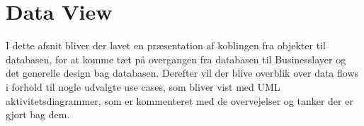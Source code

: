 \section{Data View}
I dette afsnit bliver der lavet en præsentation af koblingen fra objekter til databasen, for at komme tæt på overgangen fra databasen til Businesslayer og det generelle design bag databasen. Derefter vil der blive overblik over data flows i forhold til nogle udvalgte use cases, som bliver vist med UML aktivitetsdiagrammer, som er kommenteret med de overvejelser og tanker der er gjort bag dem. 





